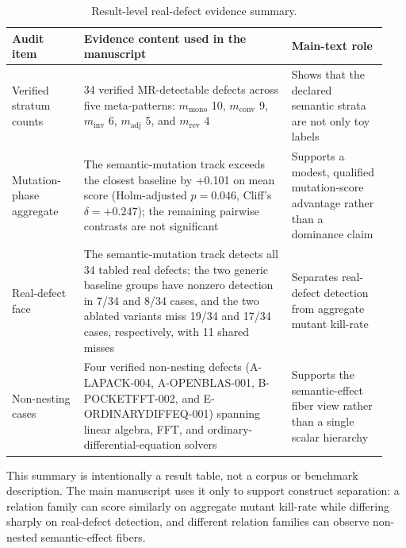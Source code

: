 \documentclass[review,12pt,authoryear]{elsarticle}
\begin{document}
{\def\LTcaptype{table} %
\small
\begin{longtable}[]{@{}p{0.18\linewidth}p{0.52\linewidth}p{0.24\linewidth}@{}}
\caption{Result-level real-defect evidence summary.}\label{tab:realdefect-ledger}\\
\toprule\noalign{}
Audit item & Evidence content used in the manuscript & Main-text role \\
\midrule\noalign{}
\endfirsthead
\endhead
\bottomrule\noalign{}
\endlastfoot
Verified stratum counts & 34 verified MR-detectable defects across five
meta-patterns: \(m_{\mathrm{mono}}\) 10, \(m_{\mathrm{conv}}\) 9,
\(m_{\mathrm{inv}}\) 6, \(m_{\mathrm{adj}}\) 5, and
\(m_{\mathrm{rev}}\) 4 & Shows that the declared semantic strata are not
only toy labels \\
Mutation-phase aggregate & The semantic-mutation track exceeds the
closest baseline by +0.101 on mean score (Holm-adjusted \(p = 0.046\),
Cliff's \(\delta = +0.247\)); the remaining pairwise contrasts are not
significant & Supports a modest, qualified
mutation-score advantage rather than a dominance claim \\
Real-defect face & The semantic-mutation track detects all 34 tabled
real defects; the two generic baseline groups have nonzero detection in
7/34 and 8/34 cases, and the two ablated variants miss 19/34 and 17/34
cases, respectively, with 11 shared misses & Separates real-defect detection from aggregate mutant
kill-rate \\
Non-nesting cases & Four verified non-nesting defects (A-LAPACK-004,
A-OPENBLAS-001, B-POCKETFFT-002, and E-ORDINARYDIFFEQ-001) spanning
linear
algebra, FFT, and ordinary-differential-equation solvers & Supports the semantic-effect fiber view rather
than a single scalar hierarchy \\
\end{longtable}
\normalsize
}

This summary is intentionally a result table, not a corpus or benchmark
description. The main manuscript uses it only to support construct
separation: a relation family can score similarly on aggregate mutant
kill-rate while differing sharply on real-defect detection, and different
relation families can observe non-nested semantic-effect fibers.



\end{document}
